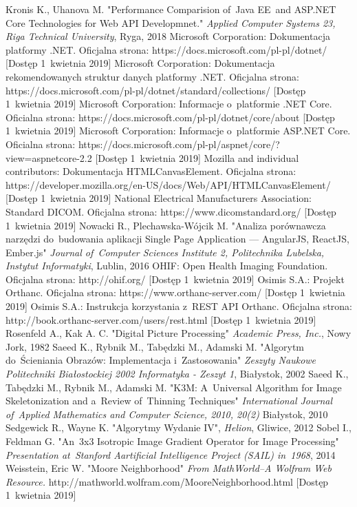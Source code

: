 \documentclass[a4paper,11pt,twoside,openright]{report}
\theoremstyle{definition}
\begin{document}
\begin{thebibliography}{24}
 Kronis K., Uhanova M. "Performance Comparision of~Java EE~and ASP.NET Core Technologies for Web API Developmnet." \emph{Applied Computer Systems 23, Riga Technical University}, Ryga, 2018
 Microsoft Corporation: Dokumentacja platformy .NET. Oficjalna strona: https://docs.microsoft.com/pl-pl/dotnet/ [Dostęp 1~kwietnia 2019]
 Microsoft Corporation: Dokumentacja rekomendowanych struktur danych platformy .NET. Oficjalna strona: https://docs.microsoft.com/pl-pl/dotnet/standard/collections/ [Dostęp 1~kwietnia 2019]
 Microsoft Corporation: Informacje o~platformie .NET Core. Oficialna strona: https://docs.microsoft.com/pl-pl/dotnet/core/about [Dostęp 1~kwietnia 2019]
 Microsoft Corporation: Informacje o~platformie ASP.NET Core. Oficialna strona: https://docs.microsoft.com/pl-pl/aspnet/core/?view=aspnetcore-2.2 [Dostęp 1~kwietnia 2019]
 Mozilla and individual contributors: Dokumentacja HTMLCanvasElement. Oficjalna strona: https://developer.mozilla.org/en-US/docs/Web/API/HTMLCanvasElement/ [Dostęp 1~kwietnia 2019]
 National Electrical Manufacturers Association: Standard DICOM. Oficjalna strona: https://www.dicomstandard.org/ [Dostęp 1~kwietnia 2019]
 Nowacki R., Plechawska-Wójcik M. "Analiza porównawcza narzędzi do~budowania aplikacji Single Page Application --- AngularJS, ReactJS, Ember.js" \emph{Journal of~Computer Sciences Institute 2, Politechnika Lubelska, Instytut Informatyki}, Lublin, 2016
 OHIF: Open Health Imaging Foundation. Oficjalna strona: http://ohif.org/ [Dostęp 1~kwietnia 2019]
 Osimis S.A.: Projekt Orthanc. Oficjalna strona: https://www.orthanc-server.com/ [Dostęp 1~kwietnia 2019]
 Osimis S.A.: Instrukcja korzystania z~REST API Orthanc. Oficjalna strona: http://book.orthanc-server.com/users/rest.html [Dostęp 1~kwietnia 2019]
 Rosenfeld A., Kak A. C. "Digital Picture Processing" \emph{Academic Press, Inc.}, Nowy Jork, 1982
 Saeed K., Rybnik M., Tabędzki M., Adamski M. "Algorytm do~Ścieniania Obrazów: Implementacja i~Zastosowania" \emph{Zeszyty Naukowe Politechniki Białostockiej 2002 Informatyka - Zeszyt 1}, Białystok, 2002
 Saeed K., Tabędzki M., Rybnik M., Adamski M. "K3M: A~Universal Algorithm for Image Skeletonization and a~Review of~Thinning Techniques" \emph{International Journal of~Applied Mathematics and Computer Science, 2010, 20(2)} Białystok, 2010
 Sedgewick R., Wayne K. "Algorytmy Wydanie IV", \emph{Helion}, Gliwice, 2012
 Sobel I., Feldman G. "An~3x3 Isotropic Image Gradient Operator for Image Processing" \emph {Presentation at~Stanford Aartificial Intelligence Project (SAIL) in~1968}, 2014
 Weisstein, Eric W. "Moore Neighborhood" \emph{From MathWorld--A Wolfram Web Resource.} http://mathworld.wolfram.com/MooreNeighborhood.html [Dostęp 1~kwietnia 2019]


\end{thebibliography}
\end{document}

